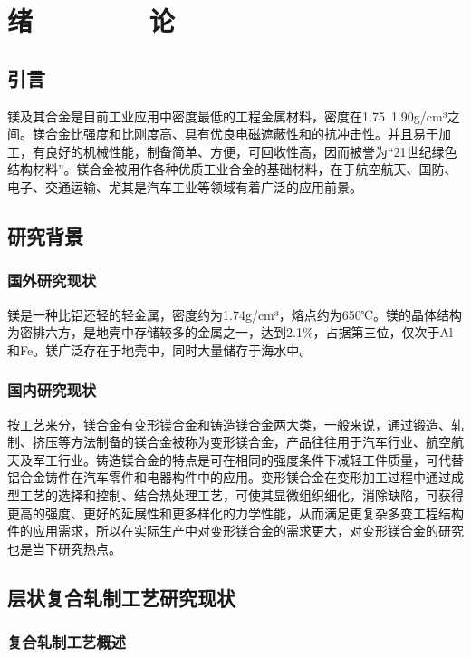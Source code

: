\section{绪\ \ \ \ \ \ \ \ 论}
\subsection{引言}

镁及其合金是目前工业应用中密度最低的工程金属材料，密度在1.75~1.90g/cm³之间。镁合金比强度和比刚度高、具有优良电磁遮蔽性和的抗冲击性。并且易于加工，有良好的机械性能，制备简单、方便，可回收性高，因而被誉为“21世纪绿色结构材料”\cite{a1,i2}。镁合金被用作各种优质工业合金的基础材料，在于航空航天、国防、电子、交通运输、尤其是汽车工业等领域有着广泛的应用前景\cite{a1,a3,i4}。\par

\subsection{研究背景}
\subsubsection{国外研究现状}

镁是一种比铝还轻的轻金属，密度约为1.74g/cm³，熔点约为650℃。镁的晶体结构为密排六方，是地壳中存储较多的金属之一，达到2.1$\%$，占据第三位，仅次于Al和Fe。镁广泛存在于地壳中，同时大量储存于海水中。\par

\subsubsection{国内研究现状}

按工艺来分，镁合金有变形镁合金和铸造镁合金两大类，一般来说，通过锻造、轧制、挤压等方法制备的镁合金被称为变形镁合金，产品往往用于汽车行业、航空航天及军工行业。铸造镁合金的特点是可在相同的强度条件下减轻工件质量，可代替铝合金铸件在汽车零件和电器构件中的应用。变形镁合金在变形加工过程中通过成型工艺的选择和控制、结合热处理工艺，可使其显微组织细化，消除缺陷，可获得更高的强度、更好的延展性和更多样化的力学性能，从而满足更复杂多变工程结构件的应用需求，所以在实际生产中对变形镁合金的需求更大，对变形镁合金的研究也是当下研究热点。\par

\subsection{层状复合轧制工艺研究现状}
\subsubsection{复合轧制工艺概述}

